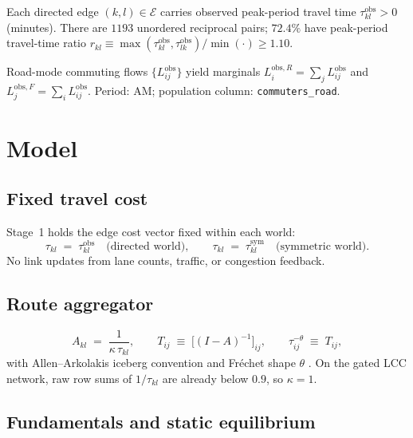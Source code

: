 \documentclass[12pt]{article}
\newcommand{\E}{\mathcal E}
\newcommand{\obs}{\mathrm{obs}}
\newcommand{\sym}{\mathrm{sym}}
\begin{document}
Each directed edge $(k,l)\in\E$ carries observed peak-period travel time
$\tau^{\obs}_{kl}>0$ (minutes).
There are $1193$ unordered reciprocal pairs; $72.4\%$ have peak-period travel-time ratio
$r_{kl}\equiv\max(\tau^{\obs}_{kl},\tau^{\obs}_{lk})/\min(\cdot)\ge 1.10$.

Road-mode commuting flows $\{L^{\obs}_{ij}\}$ yield marginals
$L^{\obs,R}_i=\sum_j L^{\obs}_{ij}$ and $L^{\obs,F}_j=\sum_i L^{\obs}_{ij}$.
Period: AM; population column: \texttt{commuters\_road}.

\section{Model}\label{sec:model}

\subsection{Fixed travel cost}

Stage~1 holds the edge cost vector fixed within each world:
\begin{equation}
  \tau_{kl} \;=\; \tau^{\obs}_{kl}
  \quad\text{(directed world)},\qquad
  \tau_{kl} \;=\; \tau^{\sym}_{kl}
  \quad\text{(symmetric world)}.
  \label{eq:fixed_tau}
\end{equation}
No link updates from lane counts, traffic, or congestion feedback.

\subsection{Route aggregator}

\begin{equation}
  A_{kl} \;=\; \frac{1}{\kappa\,\tau_{kl}},
  \qquad
  T_{ij} \;\equiv\; \bigl[(I-A)^{-1}\bigr]_{ij},
  \qquad
  \tau_{ij}^{-\theta} \;\equiv\; T_{ij},
  \label{eq:route_aggregator}
\end{equation}
with Allen--Arkolakis iceberg convention and Fréchet shape $\theta$
\citep{AllenArkolakis2022}.
On the gated LCC network, raw row sums of $1/\tau_{kl}$ are already below $0.9$, so
$\kappa=1$.

\subsection{Fundamentals and static equilibrium}
\end{document}
